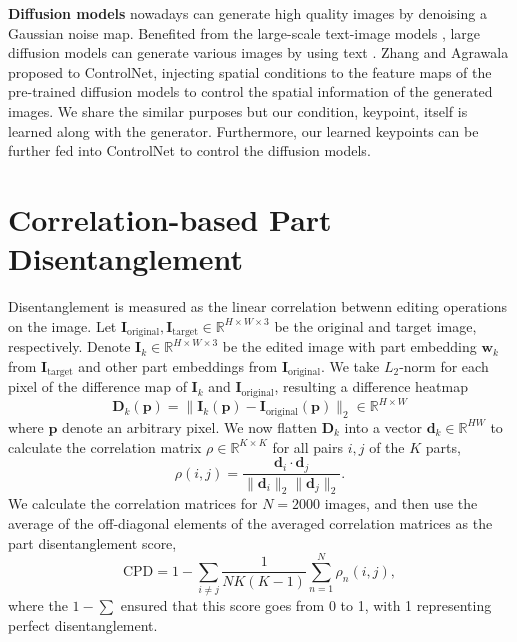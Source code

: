 \documentclass[10pt, conference, compsocconf]{IEEEtran}
\newcommand{\myR}{\mathbb{R}}
\newcommand{\vd}{\mathbf{d}}
\newcommand{\vp}{\mathbf{p}}
\newcommand{\vw}{\mathbf{w}}
\newcommand{\mD}{\mathbf{D}}
\newcommand{\mI}{\mathbf{I}}
\begin{document}
\textbf{Diffusion models} \cite{ho2020denoising, dhariwal2021diffusion} nowadays can generate high quality images by denoising a Gaussian noise map. Benefited from the large-scale text-image models \cite{radford2021learning}, large diffusion models can generate various images by using text \cite{ramesh2021zero, saharia2022photorealistic, rombach2022high}. Zhang and Agrawala \cite{zhang2023adding} proposed to ControlNet, injecting spatial conditions to the feature maps of the pre-trained diffusion models to control the spatial information of the generated images. We share the similar purposes but our condition, keypoint, itself is learned along with the generator. Furthermore, our learned keypoints can be further fed into ControlNet to control the diffusion models. \section{Correlation-based Part Disentanglement} \label{supp:cpd}
Disentanglement is measured as the linear correlation betwenn editing operations on the image. Let $\mI_\text{original},\allowbreak \mI_\text{target} \in \myR^{H\times W\times3}$ be the original and target image, respectively. Denote $\mI_k \in \myR^{H\times W\times3}$ be the edited image with part embedding $\vw_k$ from $\mI_\text{target}$ and other part embeddings from $\mI_\text{original}$. We take $L_2$-norm for each pixel of the difference map of $\mI_k$ and $\mI_\text{original}$, resulting a difference heatmap
\begin{equation}
    \mD_k(\vp) = \|\mI_k(\vp)-\mI_\text{original}(\vp)\|_2     \in \myR^{H \times W}
\label{cpe:diff_map}
\end{equation}
where $\vp$ denote an arbitrary pixel. We now flatten $\mD_k$ into a vector $\vd_k \in \myR^{H W}$ to calculate the correlation matrix $\rho\in\myR^{K\times K}$ for all pairs $i,j$ of the $K$ parts,
\begin{equation}
    \rho(i, j) = \frac{\vd_i \cdot \vd_j}{\|\vd_i\|_2\|\vd_j\|_2}.
\end{equation}
We calculate the correlation matrices for $N=2000$ images, and then use the average of the off-diagonal elements of the averaged correlation matrices as the part disentanglement score,
\begin{equation}
    \text{CPD} = 1- \sum_{i\neq j}\frac{1}{N K(K-1)}\sum_{n=1}^N\rho_n(i,j),
\end{equation}
where the $1-\sum$ ensured that this score goes from 0 to 1, with 1 representing perfect disentanglement.
\end{document}
